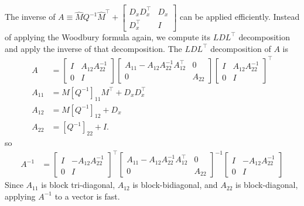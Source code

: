 \documentclass{article}
\begin{document}
The inverse of $A\equiv \hat{M} Q^{-1} \hat{M}^\top + \begin{bmatrix}
        D_x D_x^\top & D_x \\ D_x^\top & I
    \end{bmatrix}
$ can be applied efficiently. Instead of applying the Woodbury formula again, we compute its $LDL^\top$ decomposition and apply the inverse of that decomposition. The $LDL^\top$ decomposition of $A$ is
\begin{align}
    A      & =
    \begin{bmatrix}
        I & A_{12} A_{22}^{-1} \\ 0 & I
    \end{bmatrix}
    \begin{bmatrix}
        A_{11} - A_{12} A_{22}^{-1} A_{12}^\top & 0      \\
        0                                       & A_{22}
    \end{bmatrix}
    \begin{bmatrix}
        I & A_{12} A_{22}^{-1} \\ 0 & I
    \end{bmatrix}
    ^\top \nonumber                                                      \\
    A_{11} & = M \left[Q^{-1}\right]_{11} M^\top +D_x D_x^\top \nonumber \\
    A_{12} & = M\left[Q^{-1}\right]_{12} + D_x \nonumber                 \\
    A_{22} & = \left[Q^{-1}\right]_{22} + I.
\end{align}
so
\begin{align}
    A^{-1} & = \begin{bmatrix}
                   I & -A_{12} A_{22}^{-1} \\ 0 & I
               \end{bmatrix}
    ^\top
    \begin{bmatrix}
        A_{11} - A_{12} A_{22}^{-1} A_{12}^\top & 0      \\
        0                                       & A_{22}
    \end{bmatrix}
    ^{-1}
    \begin{bmatrix}
        I & -A_{12} A_{22}^{-1} \\ 0 & I
    \end{bmatrix}
\end{align}
Since $A_{11}$ is block tri-diagonal, $A_{12}$ is block-bidiagonal, and $A_{22}$ is block-diagonal, applying $A^{-1}$ to a vector is fast.
\end{document}
